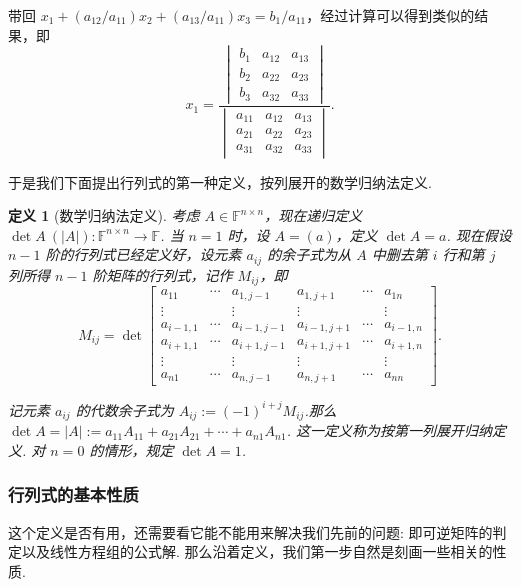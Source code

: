 \documentclass[10pt,openany]{article}
\theoremstyle{thmstyle} %
\theoremstyle{defstyle} %
\newtheorem{definition}[theorem]{定义}
\theoremstyle{prostyle} %
\theoremstyle{exastyle}
\theoremstyle{remstyle}
\newcommand{\F}{\mathbb{F}}
\newcommand{\n}{^{n \times n}}
\begin{document}
带回 \( x_1+(a_{12}/a_{11})x_2+(a_{13}/a_{11}) x_3=b_1/a_{11} \)，经过计算可以得到类似的结果，即
\[ x_1=\frac{\begin{vmatrix}
		b_{1} & a_{12} & a_{13} \\
		b_{2} & a_{22} & a_{23} \\
		b_{3} & a_{32} & a_{33} 
\end{vmatrix}}{\begin{vmatrix}
		a_{11} & a_{12} & a_{13} \\
		a_{21} & a_{22} & a_{23} \\
		a_{31} & a_{32} & a_{33} 
\end{vmatrix}}. \]

于是我们下面提出行列式的第一种定义，按列展开的数学归纳法定义.

\begin{definition}[数学归纳法定义]
	考虑 \( A \in \F\n \)，现在递归定义 \( \det A \ (|A|): \F\n \to \F \). 当 \( n=1 \) 时，设 \( A=(a) \)，定义 \( \det A=a \). 现在假设 \( n-1 \) 阶的行列式已经定义好，设元素 \( a_{ij} \) 的余子式为从 \( A \) 中删去第 \( i \) 行和第 \( j \) 列所得 \( n-1 \) 阶矩阵的行列式，记作 \( M_{ij} \)，即
	\[ M_{ij}=\det \begin{bmatrix}
		a_{11} & \cdots & a_{1,j-1} & a_{1,j+1} & \cdots & a_{1n} \\
		\vdots &        & \vdots   & \vdots   &        & \vdots \\
		a_{i-1,1} & \cdots & a_{i-1,j-1} & a_{i-1,j+1} & \cdots & a_{i-1,n} \\
		a_{i+1,1} & \cdots & a_{i+1,j-1} & a_{i+1,j+1} & \cdots & a_{i+1,n} \\
		\vdots &        & \vdots   & \vdots   &        & \vdots \\
		a_{n1} & \cdots & a_{n,j-1} & a_{n,j+1} & \cdots & a_{nn}
	\end{bmatrix}. \]
	
	记元素 \( a_{ij} \) 的代数余子式为 \( A_{ij}:=(-1)^{i+j}M_{ij} \).那么 \( \det A=|A|:= a_{11}A_{11}+a_{21}A_{21}+\cdots+a_{n1}A_{n1} \). 这一定义称为按第一列展开归纳定义. 对 \( n=0 \) 的情形，规定 \( \det A=1 \).
	\label{2.2.1}
\end{definition}

\subsubsection{行列式的基本性质}

这个定义是否有用，还需要看它能不能用来解决我们先前的问题: 即可逆矩阵的判定以及线性方程组的公式解. 那么沿着定义，我们第一步自然是刻画一些相关的性质.
\end{document}
